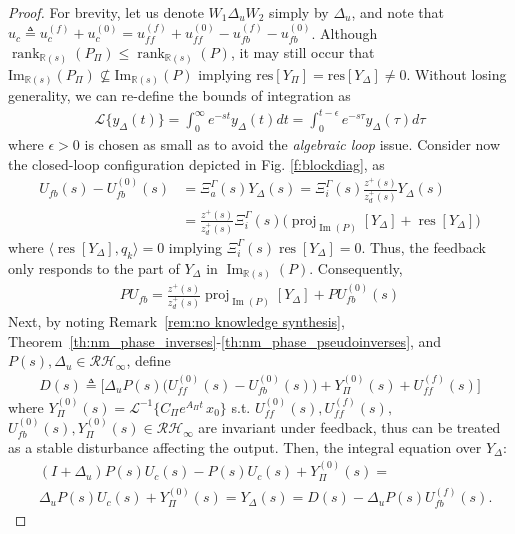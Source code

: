 \documentclass[journal]{IEEEtran}
\newcommand{\Laplace}{\mathscr{L}}
\theoremstyle{remark}
\DeclareMathOperator*{\rank}{rank}
\DeclareMathOperator*{\im}{Im}
\DeclareMathOperator*{\proj}{proj}
\DeclareMathOperator*{\res}{res}
\begin{document}
\begin{proof}
For brevity, let us denote $W_1 \Delta_u {W}_2$ simply by $\Delta_u$, and note that $u_c \triangleq u_c^{(f)}+u_c^{(0)} = u^{(f)}_{ff}+u^{(0)}_{ff}-u^{(f)}_{fb}-u^{(0)}_{fb}$. Although $\rank_{\mathbb{R}(s)}({P}_\Pi) \leq \rank_{\mathbb{R}(s)}({P})$, it may still occur that $\text{Im}_{\mathbb{R}(s)}(P_\Pi) \not \subseteq \text{Im}_{\mathbb{R}(s)}(P)$ implying $\text{res}[Y_\Pi] = \text{res}[Y_\Delta] \ne 0$. Without losing generality, we can re-define the bounds of integration as \cite[p.283-294]{debnath2016integral}
\begin{align}\label{eq:finitelaplace}
\Laplace \{ {y}_\Delta(t)\} = \int_0^\infty e^{-st}y_\Delta(t)dt = \int_0^{t-\epsilon} e^{-s\tau}y_\Delta(\tau)d\tau
\end{align}
where $\epsilon>0$ is chosen as small as to avoid the \textit{algebraic loop }issue.
Consider now the closed-loop configuration depicted in Fig. \ref{f:blockdiag}, as
\begin{align}
U_{fb}(s)-U_{fb}^{(0)}(s)&= \Xi_a^\Gamma(s){Y}_\Delta(s) = \Xi_i^\Gamma(s)\frac{z^+(s)}{z_d^+(s)}Y_\Delta(s)  \label{Ufb bary and y} \\
&=\frac{z^+(s)}{z_d^+(s)}\Xi_i^\Gamma(s)\bigr( \proj_{\im(P)}[Y_\Delta] + \res[Y_\Delta] \bigl) \nonumber
\end{align}
where $ \langle \res[Y_\Delta], q_k \rangle = 0$ implying $\Xi_i^\Gamma(s) \res[Y_\Delta] = 0$. Thus, the feedback only responds to the part of 
$Y_\Delta$ in $\im_{\mathbb{R}(s)}(P)$. Consequently,
\begin{align}
    PU_{fb}=\frac{z^+(s)}{z_d^+(s)} \proj_{\im(P)}[Y_\Delta]+PU^{(0)}_{fb}(s)
\end{align}
Next, by noting Remark~\ref{rem:no knowledge synthesis}, Theorem~\ref{th:nm_phase_inverses}-\ref{th:nm_phase_pseudoinverses}, and $P(s), \Delta_u \in \mathcal{RH}_\infty$, define 
\begin{align*}
D(s) \triangleq \bigl[ \Delta_uP(s) \bigl( U^{(0)}_{ff}(s) - U^{(0)}_{fb}(s)\bigr) + Y_\Pi^{(0)}(s) + U_{ff}^{(f)}(s) \bigr]
\end{align*}
where $Y_\Pi^{(0)}(s) = \Laplace^{-1}\{ C_\Pi e^{A_\Pi t}\,x_0 \}$ s.t. $ U^{(0)}_{ff}(s), U^{(f)}_{ff}(s), $ $U^{(0)}_{fb}(s), Y_\Pi^{(0)}(s)\in \mathcal{RH}_\infty$ are invariant under feedback, thus can be treated as a stable disturbance affecting the output. Then, the integral equation over $Y_\Delta$:
\begin{align*}
    &(I+\Delta_u)P(s)U_c(s) -P(s)U_c(s) + Y_\Pi^{(0)}(s) =\nonumber \\ &\Delta_uP(s)U_c(s)+ Y_\Pi^{(0)}(s) =Y_\Delta(s) = D(s)-\Delta_uP(s)U_{fb}^{(f)}(s).

\end{align*}
\end{proof}
\end{document}
